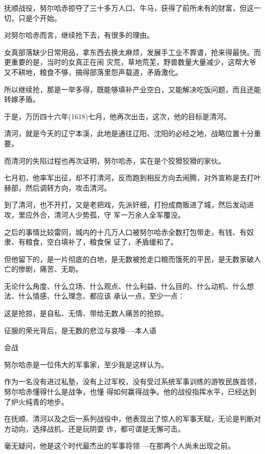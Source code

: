 \documentclass[11pt,a4paper,onecolumn]{article}
\begin{document}
抚顺战役，努尔哈赤掠夺了三十多万人口、牛马，获得了前所未有的财富，但这一切，只是个开始。

对努尔哈赤而言，继续抢下去，有很多的理由。

女真部落缺少日常用品，拿东西去换太麻烦，发展手工业不靠谱，抢来得最快。而更重要的是，当时的女真正在闹
灾荒，草地荒芜，野兽数量大量减少，这帮大爷又不耕地，粮食不够，搞得部落里怨声载道，矛盾激化。

所以继续抢，那是一举多得，既能够填补产业空白，又能解决吃饭问题，而且还能转嫁矛盾。

于是，万历四十六年(1618)七月，他再次出击，这次，他的目标是清河。

清河，就是今天的辽宁本溪，此地是通往辽阳、沈阳的必经之地，战略位置十分重要。

而清河的失陷过程也再次证明，努尔哈赤，实在是个狡猾狡猾的家伙。

七月初，他率军出征，却不打清河，反而跑到相反方向去闹腾，对外宣称是去打叶赫部，然后调转方向，攻击清河。

到了清河，也不开打，又是老把戏，先派奸细，打扮成商贩进了城，然后发动进攻，里应外合，清河人少势孤，守
军一万余人全军覆没。

之后的事情比较雷同，城内的十几万人口被努尔哈赤全数打包带走，有钱、有奴隶、有粮食，空白填补了，粮食保
证了，矛盾缓和了。

但他留下的，是一片彻底的白地，是无数被抢走口粮而饿死的平民，是无数家破人亡的惨剧，痛苦、无助。

无论什么角度、什么立场、什么观点、什么利益、什么目的、什么动机、什么想法、什么情感、什么理念、都应该
承认一点，至少一点：

这是抢掠，是自私、无情、带给无数人痛苦的抢掠。

征服的荣光背后，是无数的悲泣与哀嚎----本人语

会战

努尔哈赤是一位伟大的军事家，至少我是这样认为。

作为一名没有进过私塾，没有上过军校，没有受过系统军事训练的游牧民族首领，努尔哈赤懂得什么是战争，也懂
得如何赢得战争。他的战役指挥水平，已经达到了炉火纯青的地步。

在抚顺、清河以及之后一系列战役中，他表现出了惊人的军事天赋，无论是判断对方动向，选择战机、还是玩阴耍
诈，都可谓是无懈可击。

毫无疑问，他是这个时代最杰出的军事将领----在那两个人尚未出现之前。

\section[\thesection]{}
\end{document}
